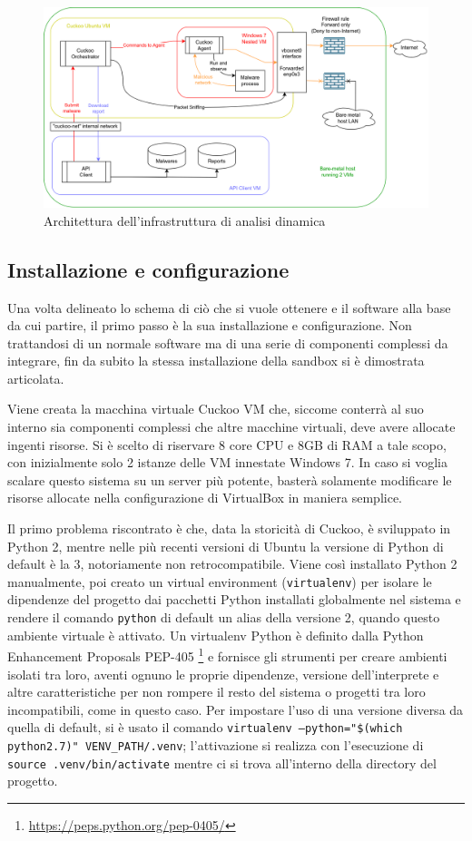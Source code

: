 \begin{figure}[H]
    \centering
    \includegraphics[width=\textwidth]{assets/cuckoo_vms.png}
    \caption{Architettura dell'infrastruttura di analisi dinamica}
    \label{fig:cuckoo_vms_architecture}
\end{figure}

\subsection{Installazione e configurazione}
\label{chap:cuckoo-installation-configuration-services}
Una volta delineato lo schema di ciò che si vuole ottenere e il software alla base da cui partire, il primo passo è la sua installazione e configurazione. Non trattandosi di un normale software ma di una serie di componenti complessi da integrare, fin da subito la stessa installazione della sandbox si è dimostrata articolata.

Viene creata la macchina virtuale Cuckoo VM che, siccome conterrà al suo interno sia componenti complessi che altre macchine virtuali, deve avere allocate ingenti risorse. Si è scelto di riservare 8 core CPU e 8GB di RAM a tale scopo, con inizialmente solo 2 istanze delle VM innestate Windows 7. In caso si voglia scalare questo sistema su un server più potente, basterà solamente modificare le risorse allocate nella configurazione di VirtualBox in maniera semplice.

Il primo problema riscontrato è che, data la storicità di Cuckoo, è sviluppato in Python 2, mentre nelle più recenti versioni di Ubuntu la versione di Python di default è la 3, notoriamente non retrocompatibile.
Viene così installato Python 2 manualmente, poi creato un virtual environment (\texttt{virtualenv}) per isolare le dipendenze del progetto dai pacchetti Python installati globalmente nel sistema e rendere il comando \texttt{python} di default un alias della versione 2, quando questo ambiente virtuale è attivato.
Un virtualenv Python è definito dalla Python Enhancement Proposals PEP-405
\footnote{\url{https://peps.python.org/pep-0405/}}
e fornisce gli strumenti per creare ambienti isolati tra loro, aventi ognuno le proprie dipendenze, versione dell'interprete e altre caratteristiche per non rompere il resto del sistema o progetti tra loro incompatibili, come in questo caso.
Per impostare l'uso di una versione diversa da quella di default, si è usato il comando \texttt{virtualenv --python="\$(which python2.7)" VENV\_PATH/.venv}; l'attivazione si realizza con l'esecuzione di \texttt{source .venv/bin/activate} mentre ci si trova all'interno della directory del progetto.

